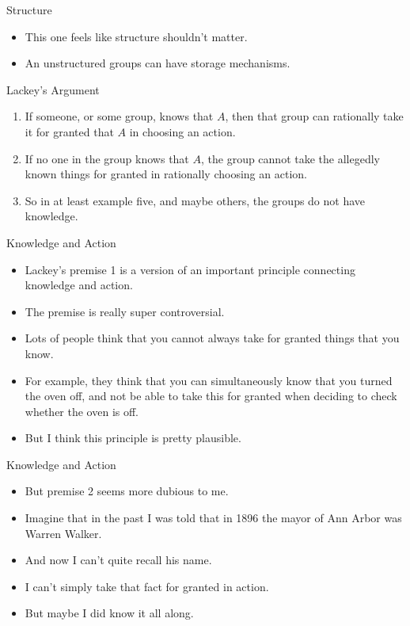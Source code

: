 \documentclass[
  ignorenonframetext,
]{beamer}
\providecommand{\tightlist}{%
  \setlength{\itemsep}{0pt}\setlength{\parskip}{0pt}}
\begin{document}
\begin{frame}{Structure}
\protect\hypertarget{structure-1}{}
\begin{itemize}
\tightlist
\item
  This one feels like structure shouldn't matter.
\item
  An unstructured groups can have storage mechanisms.
\end{itemize}
\end{frame}

\begin{frame}{Lackey's Argument}
\protect\hypertarget{lackeys-argument}{}
\begin{enumerate}
\tightlist
\item
  If someone, or some group, knows that \(A\), then that group can
  rationally take it for granted that \(A\) in choosing an action.
\item
  If no one in the group knows that \(A\), the group cannot take the
  allegedly known things for granted in rationally choosing an action.
\item
  So in at least example five, and maybe others, the groups do not have
  knowledge.
\end{enumerate}
\end{frame}

\begin{frame}{Knowledge and Action}
\protect\hypertarget{knowledge-and-action}{}
\begin{itemize}
\tightlist
\item
  Lackey's premise 1 is a version of an important principle connecting
  knowledge and action.
\item
  The premise is really super controversial.
\item
  Lots of people think that you cannot always take for granted things
  that you know.
\item
  For example, they think that you can simultaneously know that you
  turned the oven off, and not be able to take this for granted when
  deciding to check whether the oven is off.
\item
  But I think this principle is pretty plausible.
\end{itemize}
\end{frame}

\begin{frame}{Knowledge and Action}
\protect\hypertarget{knowledge-and-action-1}{}
\begin{itemize}
\tightlist
\item
  But premise 2 seems more dubious to me.
\item
  Imagine that in the past I was told that in 1896 the mayor of Ann
  Arbor was Warren Walker.
\item
  And now I can't quite recall his name.
\item
  I can't simply take that fact for granted in action.
\item
  But maybe I did know it all along.
\end{itemize}
\end{frame}
\end{document}
